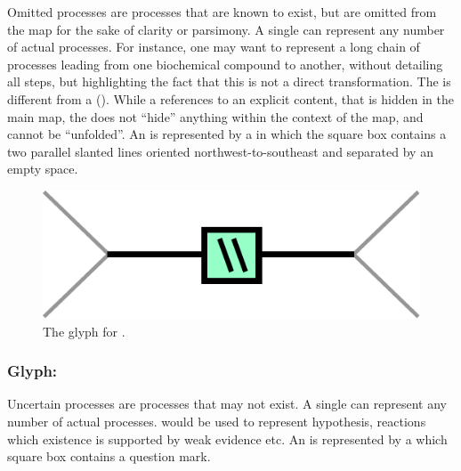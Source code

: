 Omitted processes are processes that are known to exist, but are omitted from the map for the sake of clarity or parsimony. A single  can represent any number of actual processes. For instance, one may want to represent a long chain of processes leading from one biochemical compound to another, without detailing all steps, but highlighting the fact that this is not a direct transformation.  The  is different from a  (). While a  references to an explicit content, that is hidden in the main map, the  does not ``hide'' anything within the context of the map, and cannot be ``unfolded''. An  is represented by a  in which the square box contains a two parallel slanted lines oriented northwest-to-southeast and separated by an empty space.

\begin{figure}[H]
  \centering
  \includegraphics[scale = 0.5]{le_images/omitted}
  \caption{The \PD glyph for .}
  \label{fig:omitted}
\end{figure}



\subsubsection{Glyph: }\label{sec:uncertain}

Uncertain processes are processes that may not exist. A single  can represent any number of actual processes.  would be used to represent hypothesis, reactions which existence is supported by weak evidence etc. An  is represented by a  which square box contains a question mark.

